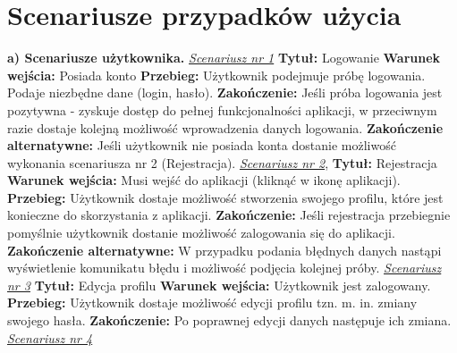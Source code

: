 	\newpage
\section{Scenariusze przypadków użycia}  %
\textbf{a) Scenariusze użytkownika.}
\newline \textit{\underline{Scenariusz nr 1}}
\newline \textbf{Tytuł:} Logowanie
\newline \textbf{Warunek wejścia:} Posiada konto
\newline \textbf{Przebieg:} Użytkownik podejmuje próbę logowania. Podaje niezbędne dane (login, hasło).  
\newline \textbf{Zakończenie:} Jeśli próba logowania jest pozytywna - zyskuje dostęp do pełnej funkcjonalności aplikacji, w przeciwnym razie dostaje kolejną możliwość wprowadzenia danych logowania.
\newline \textbf{Zakończenie alternatywne:} Jeśli użytkownik nie posiada konta dostanie możliwość wykonania scenariusza nr 2 (Rejestracja).
\newline\newline \textit{\underline{Scenariusz nr 2}}, 
\newline \textbf{Tytuł:} Rejestracja
\newline \textbf{Warunek wejścia:} Musi wejść do aplikacji (kliknąć w ikonę aplikacji).
\newline \textbf{Przebieg:} Użytkownik dostaje możliwość stworzenia swojego profilu, które jest konieczne do skorzystania z aplikacji.
\newline \textbf{Zakończenie:} Jeśli rejestracja przebiegnie pomyślnie użytkownik dostanie możliwość zalogowania się do aplikacji.
\newline \textbf{Zakończenie alternatywne:} W przypadku podania błędnych danych nastąpi wyświetlenie komunikatu błędu i możliwość podjęcia kolejnej próby.
\newline\newline \textit{\underline{Scenariusz nr 3}}
\newline \textbf{Tytuł:} Edycja profilu
\newline \textbf{Warunek wejścia:} Użytkownik jest zalogowany.
\newline \textbf{Przebieg:} Użytkownik dostaje możliwość edycji profilu tzn. m. in. zmiany swojego hasła.
\newline \textbf{Zakończenie:} Po poprawnej edycji danych następuje ich zmiana.
\newline\newline \textit{\underline{Scenariusz nr 4}}
